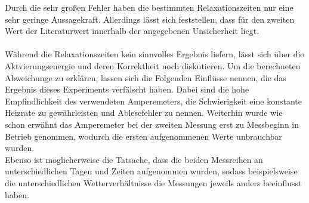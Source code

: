 Durch die sehr großen Fehler haben die bestimmten Relaxationszeiten nur eine sehr geringe Aussagekraft. Allerdings lässt sich feststellen,
dass für den zweiten Wert der Literaturwert innerhalb der angegebenen Unsicherheit liegt.\\ \\
Während die Relaxationszeiten kein sinnvolles Ergebnis liefern, lässt sich über die Aktvierungsenergie und deren Korrektheit noch diskutieren.
Um die berechneten Abweichunge zu erklären, lassen sich die Folgenden Einflüsse nennen, die das Ergebnis dieses Experiments verfälscht haben.
Dabei sind die hohe Empfindlichkeit des verwendeten Amperemeters, die Schwierigkeit eine konstante Heizrate zu gewährleisten und Ablesefehler zu nennen.
Weiterhin wurde wie schon erwähnt das Amperemeter bei der zweiten Messung erst zu Messbeginn in Betrieb genommen, wodurch die ersten aufgenommenen Werte
unbrauchbar wurden.\\
Ebenso ist möglicherweise die Tatsache, dass die beiden Messreihen an unterschiedlichen Tagen und Zeiten aufgenommen wurden,
sodass beispielsweise die unterschiedlichen Wetterverhältnisse
die Messungen jeweils anders beeinflusst haben.
